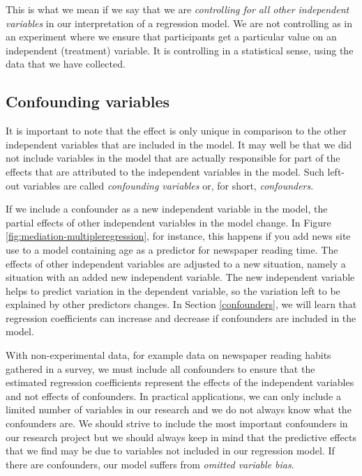 \documentclass[a4paper]{book}
\theoremstyle{definition}
\theoremstyle{definition}
\theoremstyle{definition}
\theoremstyle{remark}
\begin{document}
This is what we mean if we say that we are \emph{controlling for all
other independent variables} in our interpretation of a regression
model. We are not controlling as in an experiment where we ensure that
participants get a particular value on an independent (treatment)
variable. It is controlling in a statistical sense, using the data that
we have collected.

\subsection{Confounding variables}\label{confounding-variables}

It is important to note that the effect is only unique in comparison to
the other independent variables that are included in the model. It may
well be that we did not include variables in the model that are actually
responsible for part of the effects that are attributed to the
independent variables in the model. Such left-out variables are called
\emph{confounding variables} or, for short, \emph{confounders}.

If we include a confounder as a new independent variable in the model,
the partial effects of other independent variables in the model change.
In Figure \ref{fig:mediation-multipleregression}, for instance, this
happens if you add news site use to a model containing age as a
predictor for newspaper reading time. The effects of other independent
variables are adjusted to a new situation, namely a situation with an
added new independent variable. The new independent variable helps to
predict variation in the dependent variable, so the variation left to be
explained by other predictors changes. In Section \ref{confounders}, we
will learn that regression coefficients can increase and decrease if
confounders are included in the model.

With non-experimental data, for example data on newspaper reading habits
gathered in a survey, we must include all confounders to ensure that the
estimated regression coefficients represent the effects of the
independent variables and not effects of confounders. In practical
applications, we can only include a limited number of variables in our
research and we do not always know what the confounders are. We should
strive to include the most important confounders in our research project
but we should always keep in mind that the predictive effects that we
find may be due to variables not included in our regression model. If
there are confounders, our model suffers from \emph{omitted variable
bias}.
\end{document}
